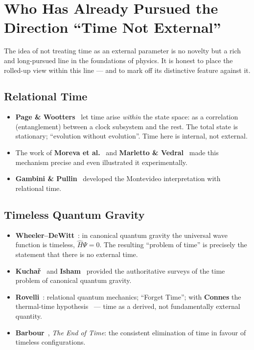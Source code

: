 \documentclass[11pt,a4paper]{article}
\begin{document}
\section{Who Has Already Pursued the Direction ``Time Not External''}

The idea of not treating time as an external parameter is no novelty but a rich and long-pursued line in the foundations of physics. It is honest to place the rolled-up view within this line --- and to mark off its distinctive feature against it.

\subsection{Relational Time}
\begin{itemize}[leftmargin=1.4em,itemsep=0.25em]
 \item \textbf{Page \& Wootters}~\cite{PageWootters1983} let time arise \emph{within} the state space: as a correlation (entanglement) between a clock subsystem and the rest. The total state is stationary; ``evolution without evolution''. Time here is internal, not external.
 \item The work of \textbf{Moreva et al.}~\cite{Moreva2014} and \textbf{Marletto \& Vedral}~\cite{MarlettoVedral2017} made this mechanism precise and even illustrated it experimentally.
 \item \textbf{Gambini \& Pullin}~\cite{GambiniPullin2015} developed the Montevideo interpretation with relational time.
\end{itemize}

\subsection{Timeless Quantum Gravity}
\begin{itemize}[leftmargin=1.4em,itemsep=0.25em]
 \item \textbf{Wheeler--DeWitt}~\cite{DeWitt1967,Wheeler1968}: in canonical quantum gravity the universal wave function is timeless, $\hat{H}\Psi = 0$. The resulting ``problem of time'' is precisely the statement that there is no external time.
 \item \textbf{Kucha\v{r}}~\cite{Kuchar1992} and \textbf{Isham}~\cite{Isham1993} provided the authoritative surveys of the time problem of canonical quantum gravity.
 \item \textbf{Rovelli}~\cite{Rovelli1996,Rovelli2009}: relational quantum mechanics; ``Forget Time''; with \textbf{Connes} the thermal-time hypothesis~\cite{ConnesRovelli1994} --- time as a derived, not fundamentally external quantity.
 \item \textbf{Barbour}~\cite{Barbour1999}, \emph{The End of Time}: the consistent elimination of time in favour of timeless configurations.
\end{itemize}
\end{document}
